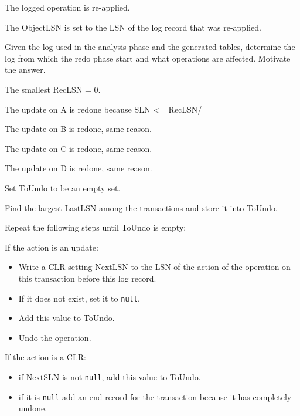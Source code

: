 \documentclass{beamer}
\begin{document}
\begin{slide}{
	\item The logged operation is re-applied.
	\item The ObjectLSN is set to the LSN of the log record that was re-applied.
}\end{slide}

\begin{slide}{
	\item Given the log used in the analysis phase and the generated tables, determine the log from which the redo phase start and what operations are affected. Motivate the answer.
		
	\vspace{1cm}
	\item The smallest RecLSN = 0.
	\item The update on A is redone because SLN <= RecLSN/
	\item The update on B is redone, same reason.
	\item The update on C is redone, same reason.
	\item The update on D is redone, same reason.	
}\end{slide}

\begin{slide}{
	\item Set ToUndo to be an empty set.
	\item Find the largest LastLSN among the transactions and store it into ToUndo.
	\item Repeat the following steps until ToUndo is empty:
	\item If the action is an update:
	\begin{itemize}
		\item Write a CLR setting NextLSN to the LSN of the action of the operation on this transaction before this log record.
		\item If it does not exist, set it to \texttt{null}.
		\item Add this value to ToUndo.
		\item Undo the operation. 
	\end{itemize} 
	\item If the action is a CLR:
		\begin{itemize}
			\item if NextSLN is not \texttt{null}, add this value to ToUndo.
			\item if it is \texttt{null} add an end record for the transaction because it has completely undone.
		\end{itemize}
}\end{slide}
\end{document}
